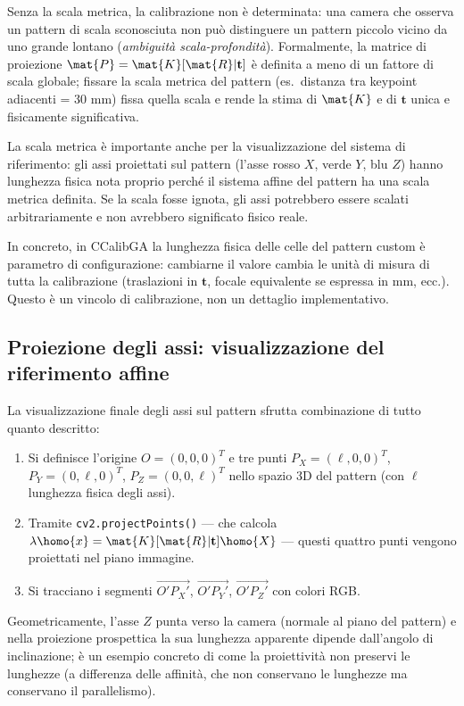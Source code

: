 Senza la scala metrica, la calibrazione non è determinata:
una camera che osserva un pattern di scala sconosciuta non può
distinguere un pattern piccolo vicino da uno grande lontano
(\emph{ambiguità scala-profondità}). Formalmente, la matrice
di proiezione \(\mat{P} = \mat{K}[\mat{R}|\mathbf{t}]\)
è definita a meno di un fattore di scala globale; fissare la scala
metrica del pattern (es.\ distanza tra keypoint adiacenti = 30 mm)
fissa quella scala e rende la stima di \(\mat{K}\) e di \(\mathbf{t}\)
unica e fisicamente significativa.

\begin{oss}
La scala metrica è importante anche per la visualizzazione del sistema
di riferimento: gli assi proiettati sul pattern (l'asse rosso \(X\),
verde \(Y\), blu \(Z\)) hanno lunghezza fisica nota proprio perché il
sistema affine del pattern ha una scala metrica definita. Se la scala
fosse ignota, gli assi potrebbero essere scalati arbitrariamente e
non avrebbero significato fisico reale.
\end{oss}

In concreto, in CCalibGA la lunghezza fisica delle celle del pattern
custom è parametro di configurazione: cambiarne il valore cambia le
unità di misura di tutta la calibrazione (traslazioni in \(\mathbf{t}\),
focale equivalente se espressa in mm, ecc.). Questo è un vincolo
di calibrazione, non un dettaglio implementativo.

\subsection{Proiezione degli assi: visualizzazione del riferimento affine}
\label{sub:proiezione_assi}

La visualizzazione finale degli assi sul pattern sfrutta
combinazione di tutto quanto descritto:
\begin{enumerate}
  \item Si definisce l'origine \(O = (0,0,0)^T\) e tre punti
  \(P_X = (\ell, 0, 0)^T\), \(P_Y = (0, \ell, 0)^T\),
  \(P_Z = (0, 0, \ell)^T\) nello spazio 3D del pattern
  (con \(\ell\) lunghezza fisica degli assi).
  \item Tramite \texttt{cv2.projectPoints()} — che calcola
  \(\lambda\homo{x} = \mat{K}[\mat{R}|\mathbf{t}]\homo{X}\) —
  questi quattro punti vengono proiettati nel piano immagine.
  \item Si tracciano i segmenti
  \(\overrightarrow{O'P_X'}\), \(\overrightarrow{O'P_Y'}\),
  \(\overrightarrow{O'P_Z'}\) con colori RGB.
\end{enumerate}

Geometricamente, l'asse \(Z\) punta verso la camera (normale al
piano del pattern) e nella proiezione prospettica la sua lunghezza
apparente dipende dall'angolo di inclinazione; è un esempio concreto
di come la proiettività non preservi le lunghezze (a differenza delle
affinità, che non conservano le lunghezze ma conservano il parallelismo).
